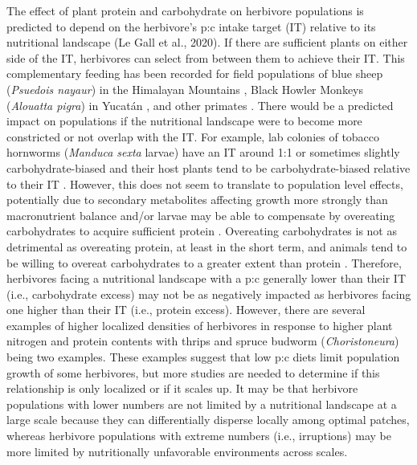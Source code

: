 \documentclass[
]{article}
\begin{document}
The effect of plant protein and carbohydrate on herbivore populations is
predicted to depend on the herbivore's p:c intake target (IT) relative
to its nutritional landscape (Le Gall et al., 2020). If there are
sufficient plants on either side of the IT, herbivores can select from
between them to achieve their IT. This complementary feeding has been
recorded for field populations of blue sheep (\emph{Psuedois nayaur}) in
the Himalayan Mountains \citep{aryal_foods_2015}, Black Howler Monkeys
(\emph{Alouatta pigra}) in Yucatán \citep{bridgeman_feeding_2012}, and
other primates \citep{raubenheimer_nutritional_2013}. There would be a
predicted impact on populations if the nutritional landscape were to
become more constricted or not overlap with the IT. For example, lab
colonies of tobacco hornworms (\emph{Manduca sexta} larvae) have an IT
around 1:1 or sometimes slightly carbohydrate-biased
\citep{wilson_dietary_2019} and their host plants tend to be
carbohydrate-biased relative to their IT
\citep{wilson_nutritional_2019}. However, this does not seem to
translate to population level effects, potentially due to secondary
metabolites affecting growth more strongly than macronutrient balance
and/or larvae may be able to compensate by overeating carbohydrates to
acquire sufficient protein \citep{wilson_dietary_2019}. Overeating
carbohydrates is not as detrimental as overeating protein, at least in
the short term, and animals tend to be willing to overeat carbohydrates
to a greater extent than protein
\citep{cheng_geometry_2008, simpson_nature_2012}. Therefore, herbivores
facing a nutritional landscape with a p:c generally lower than their IT
(i.e., carbohydrate excess) may not be as negatively impacted as
herbivores facing one higher than their IT (i.e., protein excess).
However, there are several examples of higher localized densities of
herbivores in response to higher plant nitrogen and protein contents
with thrips \citep{brown_relationship_2002} and spruce budworm
(\emph{Choristoneura}) \citep{de_grandpre_defoliation-induced_2022}
being two examples. These examples suggest that low p:c diets limit
population growth of some herbivores, but more studies are needed to
determine if this relationship is only localized or if it scales up. It
may be that herbivore populations with lower numbers are not limited by
a nutritional landscape at a large scale because they can differentially
disperse locally among optimal patches, whereas herbivore populations
with extreme numbers (i.e., irruptions) may be more limited by
nutritionally unfavorable environments across scales.
\end{document}
